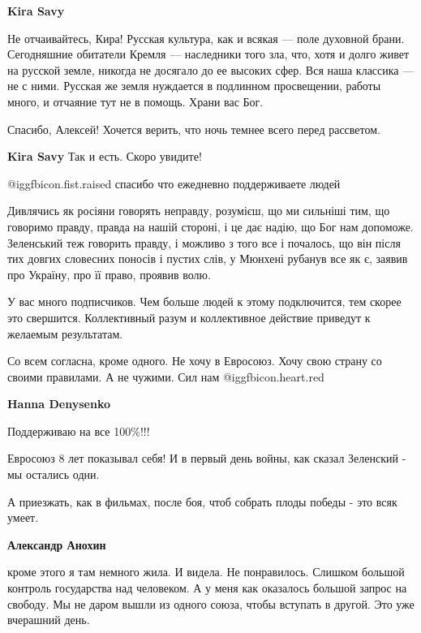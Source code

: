 \begin{itemize}
\begin{itemize}
\textbf{Kira Savy} 

Не отчаивайтесь, Кира! Русская культура, как и всякая — поле духовной брани.
Сегодняшние обитатели Кремля — наследники того зла, что, хотя и долго живет на
русской земле, никогда не досягало до ее высоких сфер. Вся наша классика — не с
ними. Русская же земля нуждается в подлинном просвещении, работы много, и
отчаяние тут не в помощь. Храни вас Бог.

Спасибо, Алексей! Хочется верить, что ночь темнее всего перед рассветом.

\textbf{Kira Savy} Так и есть. Скоро увидите!
\end{itemize} %

 @igg{fbicon.fist.raised}  спасибо что ежедневно поддерживаете людей


Дивлячись як росіяни говорять неправду, розумієш, що ми сильніші тим, що
говоримо правду, правда на нашій стороні, і це дає надію, що Бог нам допоможе.
Зеленський теж говорить правду, і можливо з того все і почалось, що він після
тих довгих словесних поносів і пустих слів, у Мюнхені рубанув все як є, заявив
про Україну, про її право, проявив волю.


У вас много подписчиков. Чем больше людей к этому подключится, тем скорее это
свершится. Коллективный разум и коллективное действие приведут к желаемым
результатам.


Со всем согласна, кроме одного. Не хочу в Евросоюз. Хочу свою страну со своими
правилами. А не чужими. Сил нам @igg{fbicon.heart.red}

\begin{itemize} %
\textbf{Hanna Denysenko} 

Поддерживаю на все 100\%!!!

Евросоюз 8 лет показывал себя! И в первый день войны, как сказал Зеленский - мы
остались одни.

А приезжать, как в фильмах, после боя, чтоб собрать плоды победы - это всяк
умеет.


\textbf{Александр Анохин} 

кроме этого я там немного жила. И видела. Не понравилось. Слишком большой
контроль государства над человеком. А у меня как оказалось большой запрос на
свободу. Мы не даром вышли из одного союза, чтобы вступать в другой. Это уже
вчерашний день.


\end{itemize}
\end{itemize}
